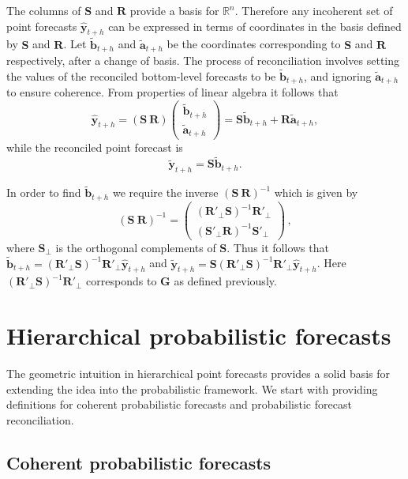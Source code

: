 \documentclass[12pt]{article}
\theoremstyle{definition}
\begin{document}
The columns of $\bm{S}$ and $\bm{R}$ provide a basis for $\mathbb{R}^n$. Therefore any incoherent set of point forecasts $\hat{\bm{y}}_{t+h}$ can be expressed in terms of coordinates in the basis defined by $\bm{S}$ and $\bm{R}$. Let $\tilde{\bm{b}}_{t+h}$ and $\tilde{\bm{a}}_{t+h}$ be the coordinates corresponding to $\bm{S}$ and $\bm{R}$ respectively, after a change of basis. The process of reconciliation involves setting the values of the reconciled bottom-level forecasts to be $\tilde{\bm{b}}_{t+h}$, and ignoring $\tilde{\bm{a}}_{t+h}$ to ensure coherence. From properties of linear algebra it follows that
\[
\hat{\bm{y}}_{t+h} = (\bm{S} ~ \bm{R})
\begin{pmatrix}
\tilde{\bm{b}}_{t+h}\\ \tilde{\bm{a}}_{t+h}
\end{pmatrix}= \bm{S}\tilde{\bm{b}}_{t+h} + \bm{R}\tilde{\bm{a}}_{t+h},
\]
while the reconciled point forecast is
\[
\tilde{\bm{y}}_{t+h} = \bm{S}\tilde{\bm{b}}_{t+h}.
\]

In order to find $\tilde{\bm{b}}_{t+h}$ we require the inverse $(\bm{S} ~ \bm{R})^{-1}$ which is given by
\begin{equation}
(\bm{S} ~ \bm{R})^{-1} = \begin{pmatrix}
(\bm{R}'_\bot \bm{S})^{-1}\bm{R}'_\bot \\ (\bm{S}'_\bot \bm{R})^{-1}\bm{S}'_\bot
\end{pmatrix}\,,
\end{equation}
where $\bm{S}_{\bot}$ is the orthogonal complements of $\bm{S}$. Thus it follows that $\tilde{\bm{b}}_{t+h}=(\bm{R}'_\bot \bm{S})^{-1}\bm{R}'_\bot \hat{\bm{y}}_{t+h}$ and $\tilde{\bm{y}}_{t+h}=\bm{S}(\bm{R}'_\bot \bm{S})^{-1}\bm{R}'_\bot \hat{\bm{y}}_{t+h}$. Here $(\bm{R}'_\bot \bm{S})^{-1}\bm{R}'_\bot$ corresponds to $\bm{G}$ as defined previously.

\section{Hierarchical probabilistic forecasts}\label{sec:ProbForecasts}

The geometric intuition in hierarchical point forecasts provides a solid basis for extending the idea into the probabilistic framework. We start with providing definitions for coherent probabilistic forecasts and probabilistic forecast reconciliation.

\subsection{Coherent probabilistic forecasts}\label{subsec:cohprobf}
\end{document}
